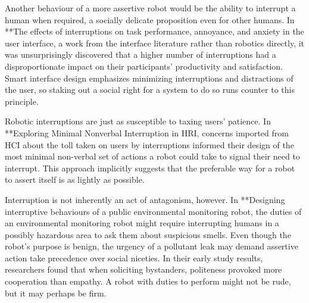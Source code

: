 \documentclass{sfuthesis}
\begin{document}

Another behaviour of a more assertive robot would be the ability to interrupt a human when required, a socially delicate proposition even for other humans. In **The effects of interruptions on task performance, annoyance, and anxiety in the user interface, a work from the interface literature rather than robotics directly, it was unsurprisingly discovered that a higher number of interruptions had a disproportionate impact on their participants' productivity and satisfaction. Smart interface design emphasizes minimizing interruptions and distractions of the user, so staking out a social right for a system to do so runs counter to this principle.

Robotic interruptions are just as susceptible to taxing users' patience. In **Exploring Minimal Nonverbal Interruption in HRI, concerns imported from HCI about the toll taken on users by interruptions informed their design of the most minimal non-verbal set of actions a robot could take to signal their need to interrupt. This approach implicitly suggests that the preferable way for a robot to assert itself is as lightly as possible.

Interruption is not inherently an act of antagonism, however. In **Designing interruptive behaviours of a public environmental monitoring robot, the duties of an environmental monitoring robot might require interrupting humans in a possibly hazardous area to ask them about suspicious smells. Even though the robot's purpose is benign, the urgency of a pollutant leak may demand assertive action take precedence over social niceties. In their early study results, researchers found that when soliciting bystanders, politeness provoked more cooperation than empathy. A robot with duties to perform might not be rude, but it may perhaps be firm.




\end{document}
